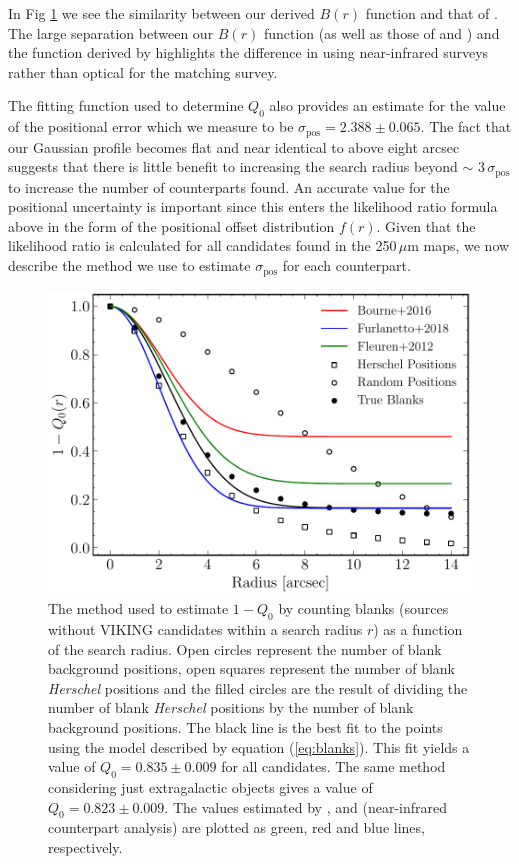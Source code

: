 \documentclass[fleqn,usenatbib]{mnras}
\begin{document}
In Fig \ref{fig:Q0} we see the similarity between our derived $B(r)$ function and that of \citealt{Furlanetto_2018}. The large separation between our $B(r)$ function (as well as those of \citealt{Furlanetto_2018} and \citealt{Fleuren_2012}) and the function derived by \citealt{Bourne_2016} highlights the difference in using near-infrared surveys rather than optical for the matching survey.

The fitting function used to determine $Q_0$ also provides an estimate for the value of the positional error which we measure to be $\sigma_{\textrm{pos}} = 2.388 \pm 0.065$. The fact that our Gaussian profile becomes flat and near identical to \citealt{Furlanetto_2018} above eight arcsec suggests that there is little benefit to increasing the search radius beyond $\sim$ 3\,$\sigma_{\textrm{pos}}$ to increase the number of counterparts found. An accurate value for the positional uncertainty is important since this enters the likelihood ratio formula above in the form of the positional offset distribution $f(r)$. Given that the likelihood ratio is calculated for all candidates found in the 250\,$\mu$m maps, we now describe the method we use to estimate $\sigma_{\textrm{pos}}$ for each counterpart.

\begin{figure}
	\includegraphics[width=\columnwidth]{Fig_3}
	\caption{The method used to estimate $1 - Q_0$ by counting blanks (sources without VIKING candidates within a search radius $r$) as a function of the search radius. Open circles represent the number of blank background positions, open squares represent the number of blank \textit{Herschel} positions and the filled circles are the result of dividing the number of blank \textit{Herschel} positions by the number of blank background positions. The black line is the best fit to the points using the model described by equation (\ref{eq:blanks}). This fit yields a value of $Q_0 = 0.835 \pm 0.009$ for all candidates. The same method considering just extragalactic objects gives a value of $Q_0 = 0.823 \pm 0.009$. The values estimated by \protect\citealt{Fleuren_2012}, \protect\citealt{Bourne_2016}  and \protect\citealt{Furlanetto_2018} (near-infrared counterpart analysis) are plotted as green, red and blue lines, respectively.}
	\label{fig:Q0}
\end{figure}
\end{document}
